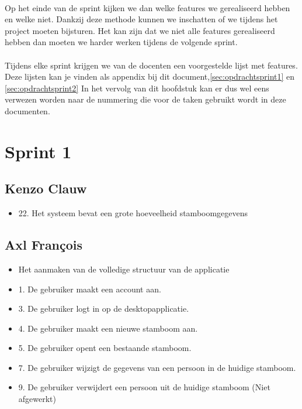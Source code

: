 \documentclass[pdftex,a4paper,12pt,twoside]{report}
\begin{document}
\paragraph{}
Op het einde van de sprint kijken we dan welke features we gerealiseerd hebben en welke niet. Dankzij deze methode kunnen we inschatten of we tijdens het project moeten bijsturen. Het kan zijn dat we niet alle features gerealiseerd hebben dan moeten we harder werken tijdens de volgende sprint.

\paragraph{}
Tijdens elke sprint krijgen we van de docenten een voorgestelde lijst met features.
Deze lijsten kan je vinden als appendix bij dit document,\ref{sec:opdrachtsprint1} en \ref{sec:opdrachtsprint2}
In het vervolg van dit hoofdstuk kan er dus wel eens verwezen worden naar de nummering die voor de taken gebruikt wordt in deze documenten.

\section{Sprint 1}

\subsection{Kenzo Clauw}

\begin{itemize}
\item 22. Het systeem bevat een grote hoeveelheid stamboomgegevens
\end{itemize}

\subsection{Axl François}

\begin{itemize}
\item Het aanmaken van de volledige structuur van de applicatie
\item 1. De gebruiker maakt een account aan.
\item 3. De gebruiker logt in op de desktopapplicatie.
\item 4. De gebruiker maakt een nieuwe stamboom aan.
\item 5. De gebruiker opent een bestaande stamboom.
\item 7. De gebruiker wijzigt de gegevens van een persoon in de huidige stamboom. 
\item 9. De gebruiker verwijdert een persoon uit de huidige stamboom (Niet afgewerkt)
\end{itemize}
\end{document}
